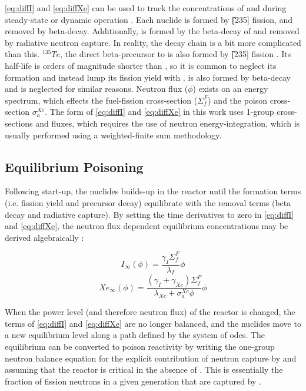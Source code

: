 \ref{eq:diffI} and \ref{eq:diffXe} can be used to track the concentrations of \I and \Xe during steady-state or dynamic operation \cite[Ch. 7]{Lamarsh}. Each nuclide is formed by \U[235] fission, and removed by beta-decay. Additionally, \Xe is formed by the beta-decay of \I and removed by radiative neutron capture. In reality, the decay chain is a bit more complicated than this. $^{135}Te$, the direct beta-precursor to \I is also formed by \U[235] fission \cite{Roberson}. Its half-life is orders of magnitude shorter than \I, so it is common to neglect its formation and instead lump its fission yield with \I. \Xe[135m] is also formed by \I beta-decay and is neglected for similar reasons. Neutron flux ($\phi$) exists on an energy spectrum, which effects the fuel-fission cross-section ($\Sigma_{f}^{F}$) and the \Xe poison cross-section $\sigma_{a}^{Xe}$. The form of \ref{eq:diffI} and \ref{eq:diffXe} in this work uses 1-group cross-sections and fluxes, which requires the use of neutron energy-integration, which is usually performed using a weighted-finite sum methodology. 

\subsection{Equilibrium Poisoning}
Following start-up, the nuclides builds-up in the reactor until the formation terms (i.e. fission yield and precursor decay) equilibrate with the removal terms (beta decay and radiative capture). By setting the time derivatives to zero in \ref{eq:diffI} and \ref{eq:diffXe}, the neutron flux dependent equilibrium concentrations may be derived algebraically \cite[Ch. 7]{Lamarsh}:

\begin{equation}\label{eq:I_eq}
    I_{\infty}(\phi) = \frac{\gamma_I \Sigma_f^F }{\lambda_I}\phi
\end{equation}
\begin{equation}\label{eq:Xe_eq}
    Xe_{\infty}(\phi) = \frac{(\gamma_I+\gamma_{Xe}) \Sigma_f^F }{\lambda_{Xe}+\sigma_a^{Xe}\phi}\phi
\end{equation}

When the power level (and therefore neutron flux) of the reactor is changed, the terms of \ref{eq:diffI} and \ref{eq:diffXe} are no longer balanced, and the nuclides move to a new equilibrium level along a path defined by the system of \acsp{ode}. The equilibrium \Xe can be converted to poison reactivity  by writing the one-group neutron balance equation for the explicit contribution of neutron capture by \Xe and assuming that the reactor is critical in the absence of \Xe. This is essentially the fraction of fission neutrons in a given generation that are captured by \Xe \cite{Bateman}.

